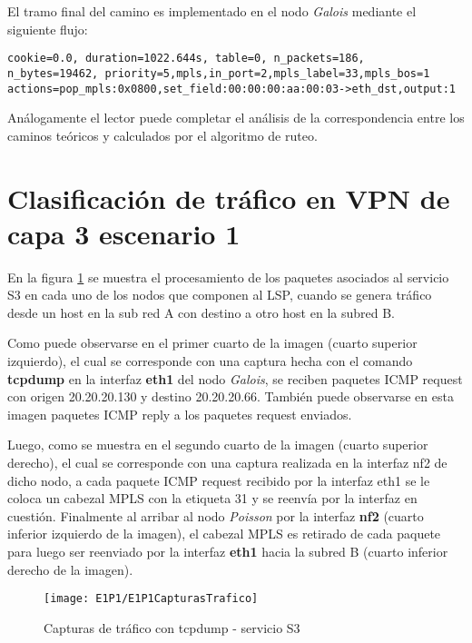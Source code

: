 El tramo final del camino es implementado en el nodo \textit{Galois} mediante el siguiente flujo:

\begin{center}
\texttt{cookie=0.0, duration=1022.644s, table=0, n\_packets=186, \\
n\_bytes=19462, priority=5,mpls,in\_port=2,mpls\_label=33,mpls\_bos=1 \\
actions=pop\_mpls:0x0800,set\_field:00:00:00:aa:00:03->eth\_dst,output:1 }
\end{center}

Análogamente el lector puede completar el análisis de la correspondencia entre los caminos te\'oricos y calculados por el algoritmo de ruteo.

\section{Clasificación de tr\'afico en VPN de capa 3 escenario 1}
\label{appendix6.2}

En la figura \ref{fig:LabE1P1CapsTraf} se muestra el procesamiento de los paquetes asociados al servicio S3 en cada uno de los nodos que componen al LSP, cuando se genera tr\'afico desde un host en la sub red A con destino a otro host en la subred B.

Como puede observarse en el primer cuarto de la imagen (cuarto superior izquierdo), el cual se corresponde con una captura hecha con el comando \textbf{tcpdump} en la interfaz \textbf{eth1} del nodo \textit{Galois}, se reciben paquetes ICMP request con origen 20.20.20.130 y destino 20.20.20.66. Tambi\'en puede observarse en esta imagen paquetes ICMP reply a los paquetes request enviados.

Luego, como se muestra en el segundo cuarto de la imagen (cuarto superior derecho), el cual se corresponde con una captura realizada en la interfaz nf2 de dicho nodo, a cada paquete ICMP request recibido por la interfaz eth1 se le coloca un cabezal MPLS con la etiqueta 31 y se reenvía por la interfaz en cuestión. Finalmente al arribar al nodo \textit{Poisson} por la interfaz \textbf{nf2} (cuarto inferior izquierdo de la imagen), el cabezal MPLS es retirado de cada paquete para luego ser reenviado por la interfaz \textbf{eth1} hacia la subred B (cuarto inferior derecho de la imagen).\\

\newpage
\begin{figure}[ht!] 
\centering    
\texttt{[image: E1P1/E1P1CapturasTrafico]}
\caption[Capturas de tr\'afico con tcpdump - servicio S3]{Capturas de tr\'afico con tcpdump - servicio S3}
\label{fig:LabE1P1CapsTraf}
\end{figure}


